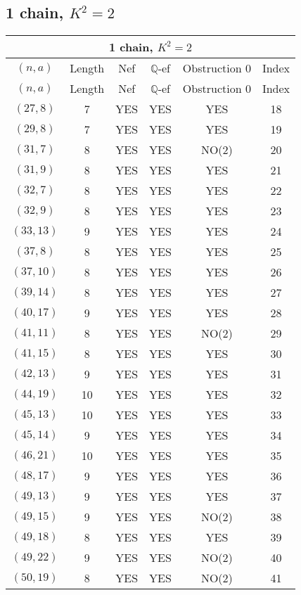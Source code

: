 \subsection{1 chain, $K^2 = 2$}
\begin{longtable}{|c|c|c|c|c|c|}
\hline
\multicolumn{6}{|c|}{1 chain, $K^2 = 2$}\\
\hline
$(n,a)$ & Length & Nef & $\mathbb Q$-ef & Obstruction 0 & Index\\
\hline
\endfirsthead

\hline
$(n,a)$ & Length & Nef & $\mathbb Q$-ef & Obstruction 0 & Index\\
\hline
\endhead
\hline
\endfoot

$(27, 8)$ & 7 & YES & YES & YES & 18\\
$(29, 8)$ & 7 & YES & YES & YES & 19\\
$(31, 7)$ & 8 & YES & YES & NO(2) & 20\\
$(31, 9)$ & 8 & YES & YES & YES & 21\\
$(32, 7)$ & 8 & YES & YES & YES & 22\\
$(32, 9)$ & 8 & YES & YES & YES & 23\\
$(33, 13)$ & 9 & YES & YES & YES & 24\\
$(37, 8)$ & 8 & YES & YES & YES & 25\\
$(37, 10)$ & 8 & YES & YES & YES & 26\\
$(39, 14)$ & 8 & YES & YES & YES & 27\\
$(40, 17)$ & 9 & YES & YES & YES & 28\\
$(41, 11)$ & 8 & YES & YES & NO(2) & 29\\
$(41, 15)$ & 8 & YES & YES & YES & 30\\
$(42, 13)$ & 9 & YES & YES & YES & 31\\
$(44, 19)$ & 10 & YES & YES & YES & 32\\
$(45, 13)$ & 10 & YES & YES & YES & 33\\
$(45, 14)$ & 9 & YES & YES & YES & 34\\
$(46, 21)$ & 10 & YES & YES & YES & 35\\
$(48, 17)$ & 9 & YES & YES & YES & 36\\
$(49, 13)$ & 9 & YES & YES & YES & 37\\
$(49, 15)$ & 9 & YES & YES & NO(2) & 38\\
$(49, 18)$ & 8 & YES & YES & YES & 39\\
$(49, 22)$ & 9 & YES & YES & NO(2) & 40\\
$(50, 19)$ & 8 & YES & YES & NO(2) & 41\\

\end{longtable}

